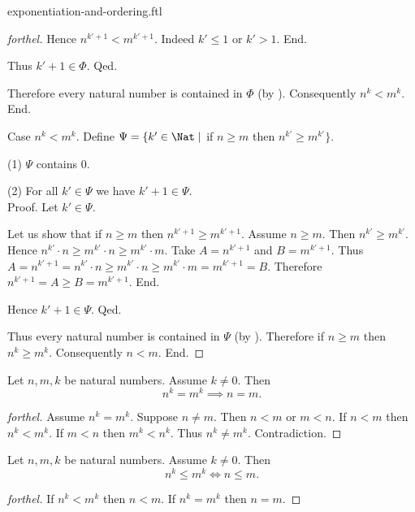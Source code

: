 \documentclass{naproche-library}
\begin{document}
\begin{smodule}{exponentiation-and-ordering.ftl}
\begin{proof}[forthel]
          Hence $n^{k' + 1} < m^{k' + 1}$.
          Indeed $k' \leq 1$ or $k' > 1$.
        End.

        Thus $k' + 1 \in \Phi$.
      Qed.

      Therefore every natural number is contained in $\Phi$ (by ).
      Consequently $n^{k} < m^{k}$.
    End.

    Case $n^{k} < m^{k}$.
      Define $\Psi = \{ k' \in \Nat \mid$ if $n \geq m$ then $n^{k'} \geq m^{k'} \}$.

      (1) $\Psi$ contains $0$.

      (2) For all $k' \in \Psi$ we have $k' + 1 \in \Psi$. \\
      Proof.
        Let $k' \in \Psi$.

        Let us show that if $n \geq m$ then $n^{k' + 1} \geq m^{k' + 1}$.
          Assume $n \geq m$.
          Then $n^{k'} \geq m^{k'}$.
          Hence $n^{k'} \cdot n \geq m^{k'} \cdot n \geq m^{k'} \cdot m$.
          Take $A = n^{k' + 1}$ and $B = m^{k' + 1}$. %
          Thus $A
            = n^{k' + 1}
            = n^{k'} \cdot n
            \geq m^{k'} \cdot n
            \geq m^{k'} \cdot m
            = m^{k' + 1}
            = B$.
          Therefore $n^{k' + 1} = A \geq B = m^{k' + 1}$.
        End.

        Hence $k' + 1 \in \Psi$.
      Qed.

      Thus every natural number is contained in $\Psi$ (by ).
      Therefore if $n \geq m$ then $n^{k} \geq m^{k}$.
      Consequently $n < m$.
    End.
  \end{proof}

  \begin{corollary}[forthel,id=ARITHMETIC_09_2797602550579200,printid]
    Let $n, m, k$ be natural numbers.
    Assume $k \neq 0$.
    Then \[ n^{k} = m^{k} \implies n = m. \]
  \end{corollary}
  \begin{proof}[forthel]
    Assume $n^{k} = m^{k}$.
    Suppose $n \neq m$.
    Then $n < m$ or $m < n$.
    If $n < m$ then $n^{k} < m^{k}$.
    If $m < n$ then $m^{k} < n^{k}$.
    Thus $n^{k} \neq m^{k}$.
    Contradiction.
  \end{proof}

  \begin{corollary}[forthel,id=ARITHMETIC_09_6875081963732992,printid]
    Let $n, m, k$ be natural numbers.
    Assume $k \neq 0$.
    Then \[ n^{k} \leq m^{k} \iff n \leq m. \]
  \end{corollary}
  \begin{proof}[forthel]
    If $n^{k} < m^{k}$ then $n < m$.
    If $n^{k} = m^{k}$ then $n = m$.


\end{proof}
\end{smodule}
\end{document}

